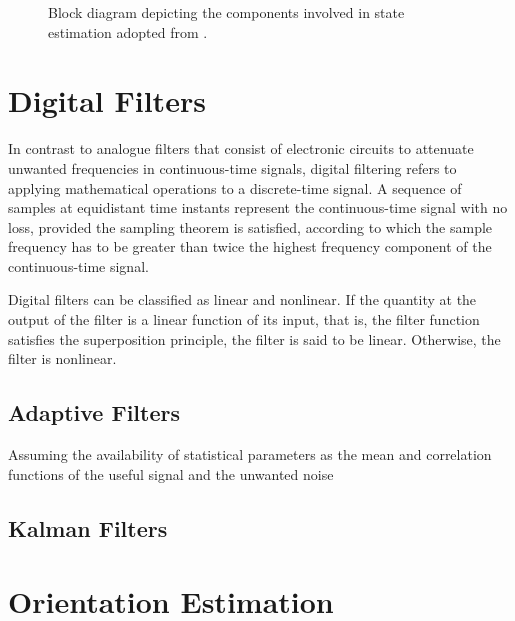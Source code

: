\begin{figure}
\centering
{}
\caption{Block diagram depicting the components involved in state estimation adopted from \cite{haykin2002adaptive}.} \label{fig:state_estimation}
\end{figure}

   

\section{Digital Filters}

In contrast to analogue filters that consist of electronic circuits to attenuate unwanted frequencies in continuous-time signals, digital filtering refers to applying mathematical operations to a discrete-time signal. A sequence of samples at equidistant time instants represent the continuous-time signal with no loss, provided the sampling theorem is satisfied, according to which the sample frequency has to be greater than twice the highest frequency component of the continuous-time signal.

Digital filters can be classified as linear and nonlinear. If the quantity at the output of the filter is a linear function of its input, that is, the filter function satisfies the superposition principle, the filter is said to be linear. Otherwise, the filter is nonlinear.

\subsection{Adaptive Filters}

Assuming the availability of statistical parameters as the mean and correlation functions of the useful signal and the unwanted noise 

\subsection{Kalman Filters}

\section{Orientation Estimation}